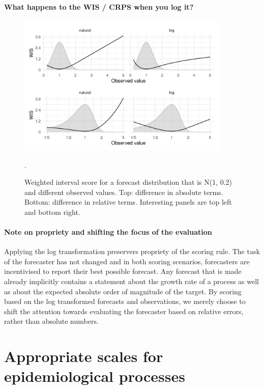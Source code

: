 \documentclass{article}
\begin{document}
\paragraph{What happens to the WIS / CRPS when you log it?}
\begin{figure}[h!]
    \centering
    \includegraphics[width=0.9\textwidth]{output/figures/SIM-effect-log-score.png}
    \caption{Weighted interval score for a forecast distribution that is N(1, 0.2) and different observed values. Top: difference in absolute terms. Bottom: difference in relative terms. Interesting panels are top left and bottom right.}. 
    \label{fig:log-crps-viz}
\end{figure}


\paragraph{Note on propriety and shifting the focus of the evaluation}
Applying the log transformation preservers propriety of the scoring rule. The task of the forecaster has not changed and in both scoring scenarios, forecasters are incentivised to report their best possible forecast. Any forecast that is made already implicitly contains a statement about the growth rate of a process as well as about the expected absolute order of magnitude of the target. By scoring based on the log transformed forecasts and observations, we merely choose to shift the attention towards evaluating the forecaster based on relative errors, rather than absolute numbers. 



\section{Appropriate scales for epidemiological processes}
\end{document}
